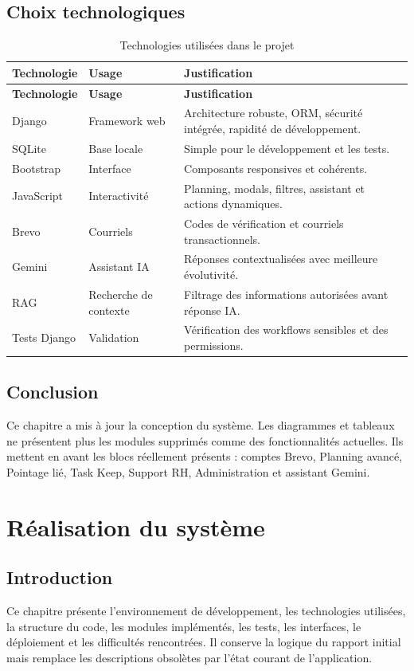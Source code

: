 \documentclass[12pt,a4paper]{report}
\begin{document}
\section{Choix technologiques}
\begin{longtable}{p{4cm}p{4cm}p{6cm}}
\caption{Technologies utilisées dans le projet}\label{tab:technologies}\\
\toprule
\textbf{Technologie} & \textbf{Usage} & \textbf{Justification}\\
\midrule
\endfirsthead
\toprule
\textbf{Technologie} & \textbf{Usage} & \textbf{Justification}\\
\midrule
\endhead
Django & Framework web & Architecture robuste, ORM, sécurité intégrée, rapidité de développement.\\
SQLite & Base locale & Simple pour le développement et les tests.\\
Bootstrap & Interface & Composants responsives et cohérents.\\
JavaScript & Interactivité & Planning, modals, filtres, assistant et actions dynamiques.\\
Brevo & Courriels & Codes de vérification et courriels transactionnels.\\
Gemini & Assistant IA & Réponses contextualisées avec meilleure évolutivité.\\
RAG & Recherche de contexte & Filtrage des informations autorisées avant réponse IA.\\
Tests Django & Validation & Vérification des workflows sensibles et des permissions.\\
\bottomrule
\end{longtable}

\section{Conclusion}
Ce chapitre a mis à jour la conception du système. Les diagrammes et tableaux ne présentent plus les modules supprimés comme des fonctionnalités actuelles. Ils mettent en avant les blocs réellement présents : comptes Brevo, Planning avancé, Pointage lié, Task Keep, Support RH, Administration et assistant Gemini.

\chapter{Réalisation du système}
\section{Introduction}
Ce chapitre présente l'environnement de développement, les technologies utilisées, la structure du code, les modules implémentés, les tests, les interfaces, le déploiement et les difficultés rencontrées. Il conserve la logique du rapport initial mais remplace les descriptions obsolètes par l'état courant de l'application.
\end{document}
